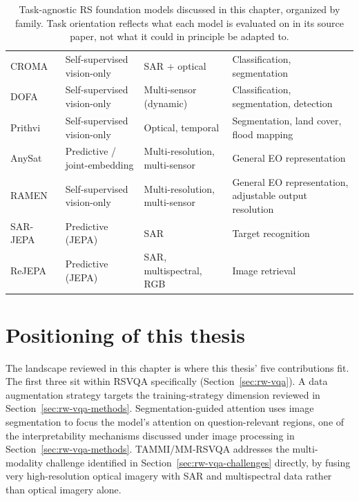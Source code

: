 \begin{table}[h]
\begin{tabularx}{\textwidth}{l l X X}
CROMA~\cite{fuller2023croma} & Self-supervised vision-only & SAR + optical & Classification, segmentation \\
DOFA~\cite{xiong2024dofa} & Self-supervised vision-only & Multi-sensor (dynamic) & Classification, segmentation, detection \\
Prithvi~\cite{jakubik2023prithvi} & Self-supervised vision-only & Optical, temporal & Segmentation, land cover, flood mapping \\
AnySat~\cite{astruc2024anysat} & Predictive / joint-embedding & Multi-resolution, multi-sensor & General EO representation \\
RAMEN~\cite{ramen} & Self-supervised vision-only & Multi-resolution, multi-sensor & General EO representation, adjustable output resolution \\
\hline
SAR-JEPA~\cite{li2023sarjepa} & Predictive (JEPA) & SAR & Target recognition \\
ReJEPA~\cite{choudhury2025rejepa} & Predictive (JEPA) & SAR, multispectral, RGB & Image retrieval \\
\hline
\end{tabularx}
\caption{Task-agnostic RS foundation models discussed in this chapter, organized by family. Task orientation reflects what each model is evaluated on in its source paper, not what it could in principle be adapted to.}
\label{tab:rw-foundation-models}
\end{table}

\section{Positioning of this thesis}
\label{sec:rw-positioning}
 
The landscape reviewed in this chapter is where this thesis' five contributions fit. The first three sit within RSVQA specifically (Section~\ref{sec:rw-vqa}). A data augmentation strategy targets the training-strategy dimension reviewed in Section~\ref{sec:rw-vqa-methods}. Segmentation-guided attention uses image segmentation to focus the model's attention on question-relevant regions, one of the interpretability mechanisms discussed under image processing in Section~\ref{sec:rw-vqa-methods}. TAMMI/MM-RSVQA addresses the multi-modality challenge identified in Section~\ref{sec:rw-vqa-challenges} directly, by fusing very high-resolution optical imagery with SAR and multispectral data rather than optical imagery alone.

